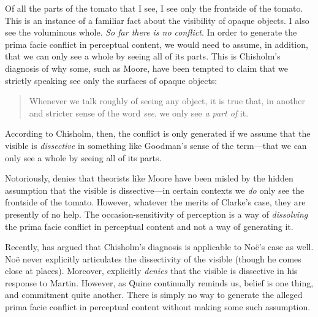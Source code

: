 \documentclass[12pt]{article}
\begin{document}
Of all the parts of the tomato that I see, I see only the frontside of the tomato. This is an instance of a familiar fact about the visibility of opaque objects. I also see the voluminous whole. \emph{So far there is no conflict}. In order to generate the prima facie conflict in perceptual content, we would need to assume, in addition, that we can only see a whole by seeing all of its parts. This is Chisholm's \citeyearpar[154--156]{Chisholm:1957dq} diagnosis of why some, such as Moore, have been tempted to claim that we strictly speaking see only the surfaces of opaque objects:
\begin{quote}
	Whenever we talk roughly of seeing any object, it is true that, in another and stricter sense of the word \emph{see}, we only see \emph{a part of} it. \citep[34]{Moore:1953nx}
\end{quote}
According to Chisholm, then, the conflict is only generated if we assume that the visible is \emph{dissective} in something like Goodman's \citeyearpar[48-49]{Goodman:1951ww} sense of the term---that we can only see a whole by seeing all of its parts. 

Notoriously, \citet{Clarke:1965yg} denies that theorists like Moore have been misled by the hidden assumption that the visible is dissective---in certain contexts we \emph{do} only see the frontside of the tomato. However, whatever the merits of Clarke's case, they are presently of no help. The occasion-sensitivity of perception is a way of \emph{dissolving} the prima facie conflict in perceptual content and not a way of generating it.

Recently, \citet{Martin:2008kl} has argued that Chisholm's diagnosis is applicable to Noë's case as well. Noë never explicitly articulates the dissectivity of the visible (though he comes close at places). Moreover, \citet[698-699]{Noe:2008oq} explicitly \emph{denies} that the visible is dissective in his response to Martin. However, as Quine continually reminds us, belief is one thing, and commitment quite another. There is simply no way to generate the alleged prima facie conflict in perceptual content without making some such assumption.
\end{document}
